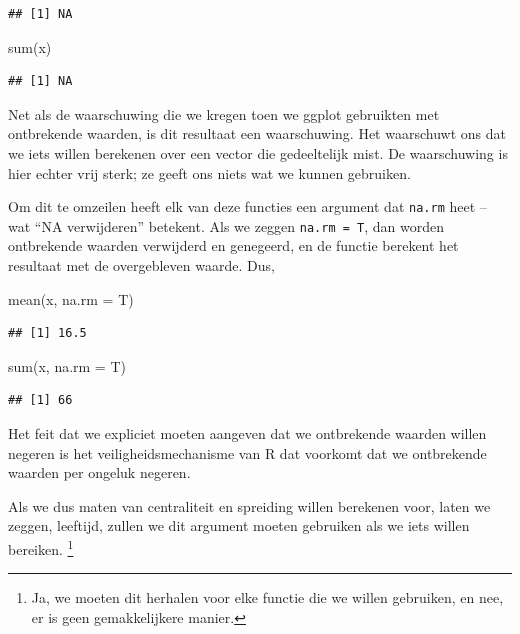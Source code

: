 \documentclass[]{tufte-book}
\newenvironment{Shaded}{}{}
\newcommand{\AttributeTok}[1]{\textcolor[rgb]{0.49,0.56,0.16}{#1}}
\newcommand{\FunctionTok}[1]{\textcolor[rgb]{0.02,0.16,0.49}{#1}}
\newcommand{\NormalTok}[1]{#1}
\begin{document}
\begin{verbatim}
## [1] NA
\end{verbatim}

\begin{Shaded}
\begin{Highlighting}[]
\FunctionTok{sum}\NormalTok{(x)}
\end{Highlighting}
\end{Shaded}

\begin{verbatim}
## [1] NA
\end{verbatim}

Net als de waarschuwing die we kregen toen we ggplot gebruikten met ontbrekende waarden, is dit resultaat een waarschuwing. Het waarschuwt ons dat we iets willen berekenen over een vector die gedeeltelijk mist. De waarschuwing is hier echter vrij sterk; ze geeft ons niets wat we kunnen gebruiken.

Om dit te omzeilen heeft elk van deze functies een argument dat \texttt{na.rm} heet -- wat ``NA verwijderen'' betekent. Als we zeggen \texttt{na.rm\ =\ T}, dan worden ontbrekende waarden verwijderd en genegeerd, en de functie berekent het resultaat met de overgebleven waarde. Dus,

\begin{Shaded}
\begin{Highlighting}[]
\FunctionTok{mean}\NormalTok{(x, }\AttributeTok{na.rm =}\NormalTok{ T)}
\end{Highlighting}
\end{Shaded}

\begin{verbatim}
## [1] 16.5
\end{verbatim}

\begin{Shaded}
\begin{Highlighting}[]
\FunctionTok{sum}\NormalTok{(x, }\AttributeTok{na.rm =}\NormalTok{ T)}
\end{Highlighting}
\end{Shaded}

\begin{verbatim}
## [1] 66
\end{verbatim}

Het feit dat we expliciet moeten aangeven dat we ontbrekende waarden willen negeren is het veiligheidsmechanisme van R dat voorkomt dat we ontbrekende waarden per ongeluk negeren.

Als we dus maten van centraliteit en spreiding willen berekenen voor, laten we zeggen, leeftijd, zullen we dit argument moeten gebruiken als we iets willen bereiken. \footnote{Ja, we moeten dit herhalen voor elke functie die we willen gebruiken, en nee, er is geen gemakkelijkere manier.}
\end{document}

